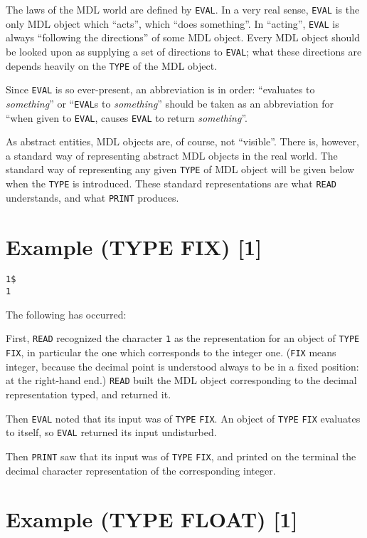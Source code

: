 \documentclass[a4paper]{scrbook}
\begin{document}
The laws of the MDL world are defined by \texttt{EVAL}. In a very real sense, \texttt{EVAL} is the only MDL object which
``acts'', which ``does something''. In ``acting'', \texttt{EVAL} is always ``following the directions'' of some MDL object.
Every MDL object should be looked upon as supplying a set of directions to \texttt{EVAL}; what these directions are depends
heavily on the \texttt{TYPE} of the MDL object.

Since \texttt{EVAL} is so ever-present, an abbreviation is in order: ``evaluates to \emph{something}'' or ``\texttt{EVAL}s
to \emph{something}'' should be taken as an abbreviation for ``when given to \texttt{EVAL}, causes \texttt{EVAL} to return
\emph{something}''.

As abstract entities, MDL objects are, of course, not ``visible''. There is, however, a standard way of representing
abstract MDL objects in the real world. The standard way of representing any given \texttt{TYPE} of MDL object will be
given below when the \texttt{TYPE} is introduced. These standard representations are what \texttt{READ} understands, and
what \texttt{PRINT} produces.

\section{Example (TYPE FIX) {[}1{]}}\label{example-type-fix-1}

\begin{verbatim}
1$
1
\end{verbatim}

The following has occurred:

First, \texttt{READ} recognized the character \texttt{1} as the representation for an object of \texttt{TYPE}
\texttt{FIX}, in particular the one which corresponds to the integer one. (\texttt{FIX} means integer,
because the decimal point is understood always to be in a fixed position: at the right-hand end.) \texttt{READ} built the
MDL object corresponding to the decimal representation typed, and returned it.

Then \texttt{EVAL} noted that its input was of \texttt{TYPE} \texttt{FIX}. An object of \texttt{TYPE} \texttt{FIX}
evaluates to itself, so \texttt{EVAL} returned its input undisturbed.

Then \texttt{PRINT} saw that its input was of \texttt{TYPE} \texttt{FIX}, and printed on the terminal the decimal character
representation of the corresponding integer.

\section{Example (TYPE FLOAT) {[}1{]}}\label{example-type-float-1}
\end{document}
